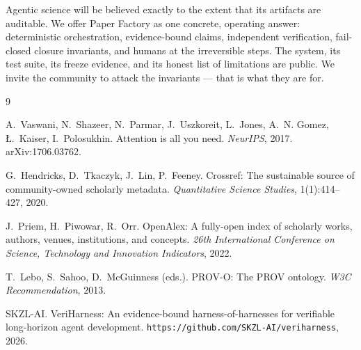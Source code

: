 \documentclass[10pt,twocolumn]{article}
\begin{document}
Agentic science will be believed exactly to the extent that its artifacts are
auditable. We offer Paper Factory as one concrete, operating answer:
deterministic orchestration, evidence-bound claims, independent verification,
fail-closed closure invariants, and humans at the irreversible steps. The
system, its test suite, its freeze evidence, and its honest list of
limitations are public. We invite the community to attack the invariants ---
that is what they are for.

\begin{thebibliography}{9}\small

A.~Vaswani, N.~Shazeer, N.~Parmar, J.~Uszkoreit, L.~Jones, A.~N. Gomez,
{\L}.~Kaiser, I.~Polosukhin.
\newblock Attention is all you need.
\newblock \emph{NeurIPS}, 2017. arXiv:1706.03762.

G.~Hendricks, D.~Tkaczyk, J.~Lin, P.~Feeney.
\newblock Crossref: The sustainable source of community-owned scholarly
metadata.
\newblock \emph{Quantitative Science Studies}, 1(1):414--427, 2020.

J.~Priem, H.~Piwowar, R.~Orr.
\newblock OpenAlex: A fully-open index of scholarly works, authors, venues,
institutions, and concepts.
\newblock \emph{26th International Conference on Science, Technology and
Innovation Indicators}, 2022.

T.~Lebo, S.~Sahoo, D.~McGuinness (eds.).
\newblock PROV-O: The PROV ontology.
\newblock \emph{W3C Recommendation}, 2013.

SKZL-AI.
\newblock VeriHarness: An evidence-bound harness-of-harnesses for verifiable
long-horizon agent development.
\newblock \texttt{https://github.com/SKZL-AI/veriharness}, 2026.

\end{thebibliography}
\end{document}
